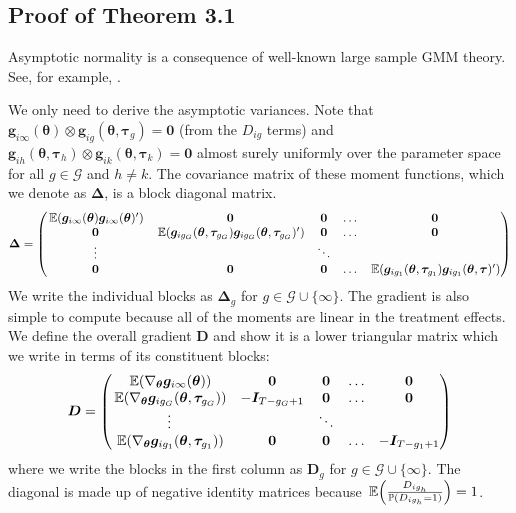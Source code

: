 \documentclass[12pt]{article}
\begin{document}
\subsection*{Proof of Theorem 3.1}

Asymptotic normality is a consequence of well-known large sample GMM theory. See, for example, \citet{Hansen_1982}.

We only need to derive the asymptotic variances. Note that $\bm g_{i\infty}(\bm{\theta}) \otimes \bm g_{ig}(\bm{\theta}, \bm \tau_g) = \bm 0$ (from the $D_{ig}$ terms) and $\bm g_{ih}(\bm{\theta}, \bm \tau_h) \otimes \bm g_{ik}(\bm{\theta}, \bm \tau_k) = \bm 0$ almost surely uniformly over the parameter space for all $g \in \mathcal{G}$ and $h \neq k$. The covariance matrix of these moment functions, which we denote as $\bm \Delta$, is a block diagonal matrix.
\begin{equation*}
    \bm \Delta =
    \begin{pmatrix}
        \expec{\bm g_{i \infty}(\bm{\theta}) \bm g_{i \infty}(\bm{\theta})'} & \bm 0 & \bm 0 & \hdots & \bm 0\\
        \bm 0 &  \expec{\bm g_{i g_G}(\bm{\theta}, \bm \tau_{g_G}) \bm g_{i g_G}(\bm{\theta}, \bm \tau_{g_G})' } & \bm 0 & \hdots & \bm 0\\
        \vdots & & \ddots  &\\
        \bm 0 & \bm 0 & \bm 0 & \hdots & \expec{ \bm g_{i g_1}(\bm{\theta}, \bm \tau_{g_1}) \bm g_{i g_1}(\bm{\theta}, \bm \tau)'}
    \end{pmatrix}
\end{equation*}
We write the individual blocks as $\bm \Delta_g$ for $g \in \mathcal{G} \cup \{ \infty \}$. The gradient is also simple to compute because all of the moments are linear in the treatment effects. We define the overall gradient $\bm D$ and show it is a lower triangular matrix which we write in terms of its constituent blocks:
\begin{equation*}
    \bm D = 
    \begin{pmatrix}
        \expec{\nabla_{\bm{\theta}} \bm g_{i\infty}(\bm{\theta}) } & \bm 0 & \bm 0 & \hdots & \bm 0\\
        \expec{\nabla_{\bm{\theta}} \bm g_{ig_G}(\bm{\theta}, \bm \tau_{g_G})} & -\bm I_{T - g_G + 1} & \bm 0 & \hdots & \bm 0\\
        \vdots & & \ddots  &\\
        \expec{\nabla_{\bm{\theta}} \bm g_{ig_1}(\bm{\theta}, \bm \tau_{g_1})} & \bm 0 & \bm 0 & \hdots & -\bm I_{T - g_1 + 1}
    \end{pmatrix}
\end{equation*}
where we write the blocks in the first column as $\bm D_g$ for $g \in \mathcal{G} \cup \{ \infty \}$. The diagonal is made up of negative identity matrices because $\expec{\frac{D_{ig_h}}{\mathbb{P}(D_{ig_h} = 1)}} = 1$.
\end{document}

